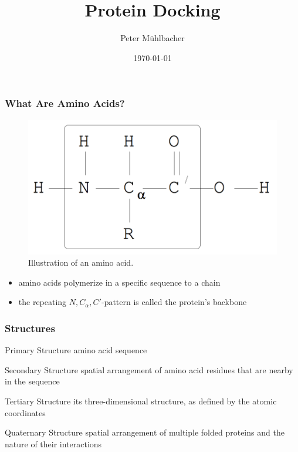 \documentclass{beamer}
\title[Protein Docking]{Protein Docking}
\author{Peter M\"uhlbacher}
\date{\today}
\begin{document}
\begin{frame}
\titlepage
\end{frame}


\begin{frame}
\frametitle{What Are Amino Acids?}

\begin{figure}
\caption{Illustration of an amino acid. \cite{neumaier}}
\includegraphics[width=0.7\linewidth]{aminoacid.png}
\end{figure}

\begin{itemize}
	\item amino acids polymerize in a specific sequence to a chain
	\item the repeating $N,C_\alpha,C'$-pattern is called the protein's backbone
\end{itemize}

\end{frame}


\begin{frame}
\frametitle{Structures}

\begin{block}{Primary Structure}
amino acid sequence
\end{block}

\begin{block}{Secondary Structure}
spatial arrangement of amino acid residues that are nearby in the sequence
\end{block}

\begin{block}{Tertiary Structure}
its three-dimensional structure, as defined by the atomic coordinates
\end{block}

\begin{block}{Quaternary Structure}
spatial arrangement of multiple folded proteins and the nature of their interactions \cite{berg}
\end{block}


\end{frame}
\end{document}
